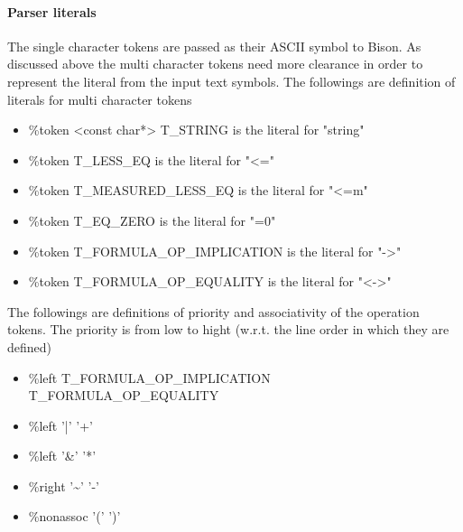 \documentclass{article}
\begin{document}
		\paragraph{Parser literals}
			The single character tokens are passed as their ASCII symbol to Bison. 
			As discussed above the multi character tokens need more clearance in order to represent the literal from the input text symbols.
			The followings are definition of literals for multi character tokens
			\begin{itemize}
				\item \%token <const char*> T\_STRING is the literal for "string"
				\item \%token T\_LESS\_EQ is the literal for "<="
				\item \%token T\_MEASURED\_LESS\_EQ is the literal for "<=m"
				\item \%token T\_EQ\_ZERO is the literal for "=0"
				\item \%token T\_FORMULA\_OP\_IMPLICATION is the literal for "->"
				\item \%token T\_FORMULA\_OP\_EQUALITY is the literal for "<->"
			\end{itemize}
			The followings are definitions of priority and associativity of the operation tokens. 
			The priority is from low to hight (w.r.t. the line order in which they are defined)
			\begin{itemize}
				\item \%left T\_FORMULA\_OP\_IMPLICATION T\_FORMULA\_OP\_EQUALITY
				\item \%left '|' '+'
				\item \%left '\&' '*'
				\item \%right '\textasciitilde' '-'
				\item \%nonassoc '(' ')'
			\end{itemize}
\end{document}
